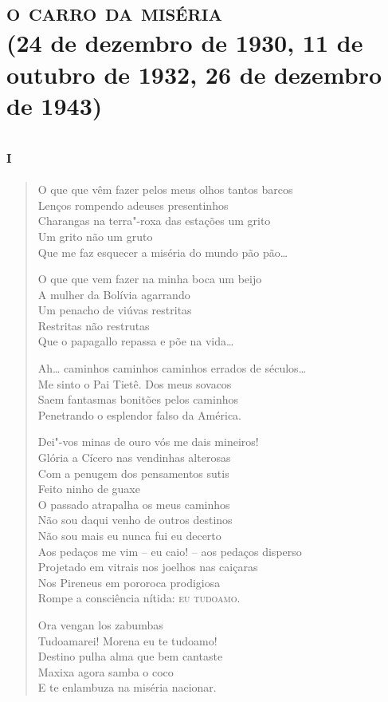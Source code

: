 \movetooddpage
{}
\part[o carro da miséria]{\textsc{o carro da miséria}\\{\large (24 de dezembro de 1930, 11 de outubro de 1932, 26 de dezembro de 1943)}}
\removeepigraph

\chapter[«O que que vêm fazer pelos meus olhos tantos barcos»]{\textsc{i}}

\begin{verse}
O que que vêm fazer pelos meus olhos tantos barcos\\
Lenços rompendo adeuses presentinhos\\
Charangas na terra"-roxa das estações um grito\\
Um grito não um gruto\\
Que me faz esquecer a miséria do mundo pão pão\ldots{}

O que que vem fazer na minha boca um beijo\\
A mulher da Bolívia agarrando\\
Um penacho de viúvas restritas\\
Restritas não restrutas\\
Que o papagallo repassa e põe na vida\ldots{}

Ah\ldots{} caminhos caminhos caminhos errados de séculos\ldots{}\\
Me sinto o Pai Tietê. Dos meus sovacos\\
Saem fantasmas bonitões pelos caminhos\\
Penetrando o esplendor falso da América.

Dei"-vos minas de ouro vós me dais mineiros!\\
Glória a Cícero nas vendinhas alterosas\\
Com a penugem dos pensamentos sutis\\
Feito ninho de guaxe\\
O passado atrapalha os meus caminhos\\
Não sou daqui venho de outros destinos\\
Não sou mais eu nunca fui eu decerto\\
Aos pedaços me vim -- eu caio! -- aos pedaços disperso\\
Projetado em vitrais nos joelhos nas caiçaras\\
Nos Pireneus em pororoca prodigiosa\\
Rompe a consciência nítida: \textsc{eu tudoamo.}

Ora vengan los zabumbas\\
Tudoamarei! Morena eu te tudoamo!\\
Destino pulha alma que bem cantaste\\
Maxixa agora samba o coco\\
E te enlambuza na miséria nacionar.
\end{verse}

